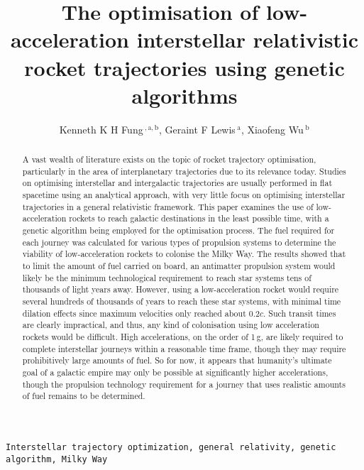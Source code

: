 \documentclass[review]{elsarticle}
\begin{document}
\begin{frontmatter}

\title{The optimisation of low-acceleration interstellar relativistic rocket trajectories using genetic algorithms}

\author{Kenneth K H Fung\,$^{,\mathrm{a,b}}$, Geraint F Lewis\,$^\mathrm{a}$, Xiaofeng Wu\,$^\mathrm{b}$}

\address{$^\mathrm{a}$\,Sydney Institute for Astronomy, School of Physics, A28, The University of Sydney, NSW 2006, Australia}
\address{$^\mathrm{b}$\,School of Aerospace, Mechanical and Mechatronic Engineering, J07, The University of Sydney, NSW 2006, Australia}

\begin{abstract}
A vast wealth of literature exists on the topic of rocket trajectory optimisation, particularly in the area of interplanetary trajectories due to its relevance today. Studies on optimising interstellar and intergalactic trajectories are usually performed in flat spacetime using an analytical approach, with very little focus on optimising interstellar trajectories in a general relativistic framework. This paper examines the use of low-acceleration rockets to reach galactic destinations in the least possible time, with a genetic algorithm being employed for the optimisation process. The fuel required for each journey was calculated for various types of propulsion systems to determine the viability of low-acceleration rockets to colonise the Milky Way. The results showed that to limit the amount of fuel carried on board, an antimatter propulsion system would likely be the minimum technological requirement to reach star systems tens of thousands of light years away. However, using a low-acceleration rocket would require several hundreds of thousands of years to reach these star systems, with minimal time dilation effects since maximum velocities only reached about $0.2c$. Such transit times are clearly impractical, and thus, any kind of colonisation using low acceleration rockets would be difficult. High accelerations, on the order of 1\,g, are likely required to complete interstellar journeys within a reasonable time frame, though they may require prohibitively large amounts of fuel. So for now, it appears that humanity's ultimate goal of a galactic empire may only be possible at significantly higher accelerations, though the propulsion technology requirement for a journey that uses realistic amounts of fuel remains to be determined.

\end{abstract}

\begin{keyword}
\texttt{Interstellar trajectory optimization, general relativity, genetic algorithm, Milky Way}
\end{keyword}

\end{frontmatter}
\end{document}
